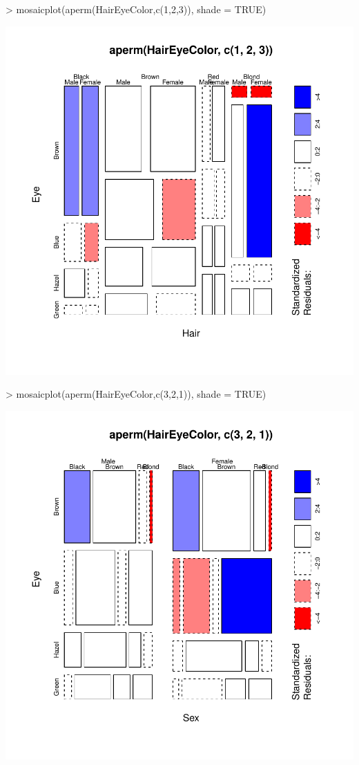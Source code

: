 \documentclass[12pt,letterpaper,final]{article}
\begin{document}
\begin{enumerate}
\begin{enumerate}
{\newpage
\begin{Schunk}
\begin{Sinput}
> mosaicplot(aperm(HairEyeColor,c(1,2,3)), shade = TRUE)
\end{Sinput}
\end{Schunk}
\includegraphics{hw02_bartschi-014}
\newpage
\begin{Schunk}
\begin{Sinput}
> mosaicplot(aperm(HairEyeColor,c(3,2,1)), shade = TRUE)
\end{Sinput}
\end{Schunk}
\includegraphics{hw02_bartschi-015}
}



\end{enumerate}
\end{enumerate}
\end{document}
